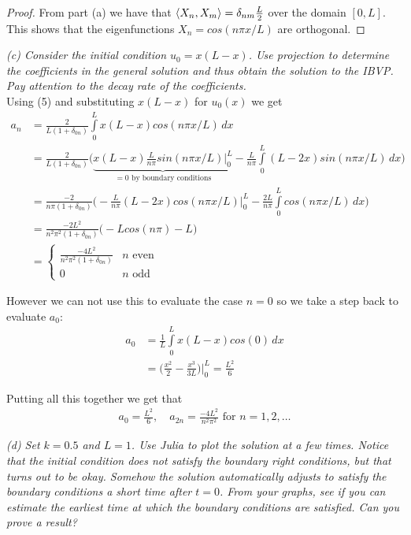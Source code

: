 \documentclass[10pt]{article}
\theoremstyle{remark}
\begin{document}
\begin{proof}
From part (a) we have that $\braket{X_n,X_m} = \delta_{nm}\frac{L}{2}$ over the domain $[0,L]$. This shows that the eigenfunctions $X_n = cos(n\pi x/L)$ are orthogonal.
\end{proof}

\textit{(c) Consider the initial condition $u_0 = x(L-x)$. Use projection to determine the coefficients in the general solution and thus obtain the solution to the IBVP. Pay attention to the decay rate of the coefficients.} \\ 

Using (5) and substituting $x(L-x)$ for $u_0(x)$ we get
\begin{align*}
	a_n & = \frac{2}{L(1 + \delta_{0n})}\int\limits_0^L x(L-x)cos(n\pi x/L) \, dx \\
	& = \frac{2}{L(1 + \delta_{0n})}\bigg(\underbrace{x(L-x)\frac{L}{n\pi}sin(n\pi x/L)\bigg\vert_0^L}_{= 0 \text{ by boundary conditions}} - \frac{L}{n\pi}\int\limits_0^L (L - 2x)sin(n\pi x/L) \, dx\bigg) \\ 
	& = \frac{-2}{n\pi(1 + \delta_{0n})}\bigg(-\frac{L}{n\pi}(L - 2x)cos(n\pi x/L)\bigg\vert_0^L - \frac{2L}{n\pi}\int\limits_0^L cos(n\pi x/L) \, dx\bigg) \\
	& = \frac{-2L^2}{n^2\pi^2(1 + \delta_{0n})}\bigg(-Lcos(n\pi) - L\bigg) \\
	& = {
		\begin{cases}
		\frac{-4L^2}{n^2\pi^2(1 + \delta_{0n})} & n \text{ even} \\
		0 & n \text{ odd}
		\end{cases}
		}
\end{align*}

However we can not use this to evaluate the case $n = 0$ so we take a step back to evaluate $a_0$:
\begin{align*}
	a_0 & = \frac{1}{L}\int\limits_0^L x(L-x)cos(0) \, dx \\
	& = \bigg(\frac{x^2}{2} - \frac{x^3}{3L}\bigg)\bigg\vert_0^L = \frac{L^2}{6}
\end{align*}

Putting all this together we get that 
\begin{align*}
	\boxed{a_0 = \frac{L^2}{6}, \quad a_{2n} = \frac{-4L^2}{n^2\pi^2} \text{ for } n = 1,2,\ldots}
\end{align*}

\textit{(d) Set $k = 0.5$ and $L = 1$. Use Julia to plot the solution at a few times. Notice that the initial condition does not satisfy the boundary right conditions, but that turns out to be okay. Somehow the solution automatically adjusts to satisfy the boundary conditions a short time after $t = 0$. From your graphs, see if you can estimate the earliest time at which the boundary conditions are satisfied. Can you prove a result?} \\
\end{document}
